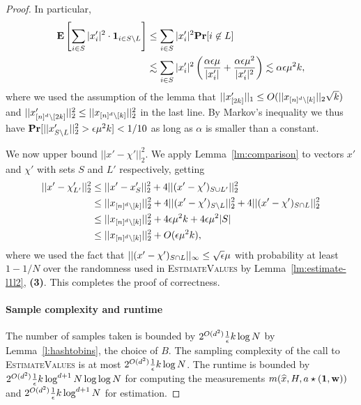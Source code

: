 \begin{proof}
In particular, 
\begin{equation*}
\begin{split}
{\bf \mbox{\bf E}}\left[\sum_{i\in S} |x'_i|^2\cdot \mathbf{1}_{i\in S\setminus L}\right]&\leq \sum_{i\in S} |x'_i|^2 {\bf \mbox{\bf Pr}}[i\not \in L]\\
&\lesssim \sum_{i\in S} |x'_i|^2 \left(\frac{\alpha {\epsilon} \mu}{|x'_i|}+\frac{\alpha {\epsilon} \mu^2}{|x'_i|^2}\right)\lesssim \alpha {\epsilon}\mu^2 k,
\end{split}
\end{equation*}
where we used the assumption of the lemma that $||x'_{[2k]}||_1\leq O(||x_{{[n]^d}\setminus [k]}||_2\sqrt{k})$ and $||x'_{{[n]^d}\setminus [2k]}||_2^2\leq ||x_{{[n]^d}\setminus [k]}||_2^2$ in the last line.
By Markov's inequality we thus have ${\bf \mbox{\bf Pr}}[||x'_{S\setminus L}||_2^2>{\epsilon} \mu^2 k]<1/10$ as long as $\alpha$ is smaller than a constant. 

We now upper bound $||x'-\chi'||_2^2$. We apply Lemma~\ref{lm:comparison} to vectors $x'$ and $\chi'$ with sets $S$ and $L'$ respectively, getting 
\begin{equation*}
\begin{split}
||x'-\chi'_{L'}||_2^2&\leq ||x'-x'_S||_2^2+4||(x'-\chi')_{S\cup L'}||_2^2\\
&\leq ||x_{{[n]^d}\setminus [k]}||_2^2+4||(x'-\chi')_{S\setminus L}||_2^2+4||(x'-\chi')_{S\cap L}||_2^2\\
&\leq ||x_{{[n]^d}\setminus [k]}||_2^2+4{\epsilon} \mu^2 k+4{\epsilon} \mu^2 |S|\\
&\leq ||x_{{[n]^d}\setminus [k]}||_2^2+O({\epsilon} \mu^2 k),\\
\end{split}
\end{equation*}
where we used the fact that $||(x'-\chi')_{S\cap L}||_\infty\leq \sqrt{{\epsilon}} \mu$ with probability at least $1-1/N$ over the randomness used in \textsc{EstimateValues} by Lemma~\ref{lm:estimate-l1l2}, {\bf (3)}.
This completes the proof of correctness.


\paragraph{Sample complexity and runtime}The number of samples taken is bounded by $2^{O(d^2)}\frac1{{\epsilon}} k\log N$ by Lemma~\ref{l:hashtobins}, the choice of $B$. The sampling complexity of the call to \textsc{EstimateValues} is at most $2^{O(d^2)}\frac1{{\epsilon}} k\log N$. The runtime is bounded by $2^{O(d^2)}\frac1{{\epsilon}}k \log^{d+1} N \log\log N$ for computing the measurements $m(\widehat{x}, H, a\star (\mathbf{1}, \mathbf{w}))$ and $2^{O(d^2)}\frac1{{\epsilon}} k \log^{d+1} N$ for estimation.
\end{proof}